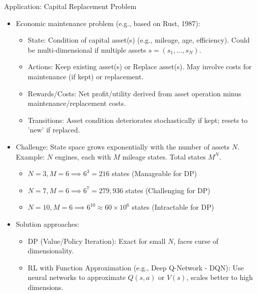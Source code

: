 \documentclass[10pt]{beamer}
\begin{document}

\begin{frame}{Application: Capital Replacement Problem}
 \begin{itemize}
        \item Economic maintenance problem (e.g., based on Rust, 1987):
        \begin{itemize}
            \item State: Condition of capital asset(s) (e.g., mileage, age, efficiency). Could be multi-dimensional if multiple assets $s=(s_1, ..., s_N)$.
            \item Actions: Keep existing asset(s) or Replace asset(s). May involve costs for maintenance (if kept) or replacement.
            \item Rewards/Costs: Net profit/utility derived from asset operation minus maintenance/replacement costs.
            \item Transitions: Asset condition deteriorates stochastically if kept; resets to 'new' if replaced.
        \end{itemize}
        \vspace{0.2cm}
        \item Challenge: State space grows exponentially with the number of assets $N$.
         Example: $N$ engines, each with $M$ mileage states. Total states $M^N$.
         \begin{itemize}
              \item $N=3, M=6 \implies 6^3 = 216$ states (Manageable for DP)
              \item $N=7, M=6 \implies 6^7 = 279,936$ states (Challenging for DP)
              \item $N=10, M=6 \implies 6^{10} \approx 60 \times 10^6$ states (Intractable for DP)
         \end{itemize}
        \vspace{0.2cm}
        \item Solution approaches:
        \begin{itemize}
            \item DP (Value/Policy Iteration): Exact for small $N$, faces curse of dimensionality.
            \item RL with Function Approximation (e.g., Deep Q-Network - DQN): Use neural networks to approximate $Q(s,a)$ or $V(s)$, scales better to high dimensions.
        \end{itemize}
    \end{itemize}
\end{frame}
\end{document}
